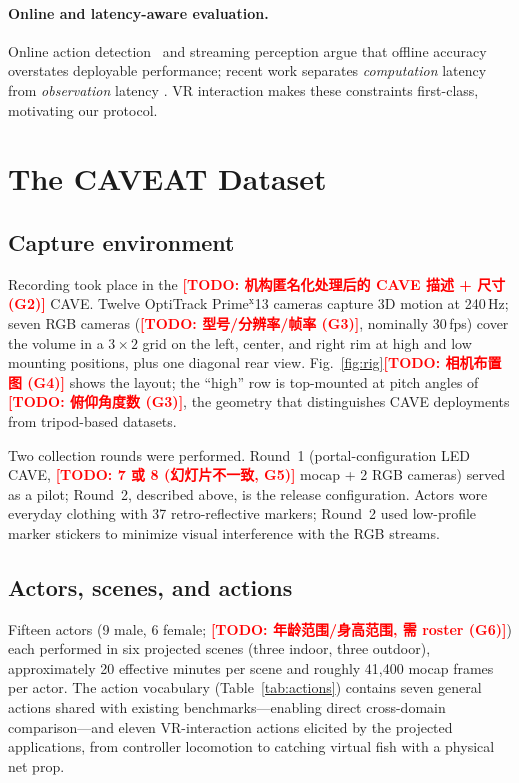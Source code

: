 \documentclass[10pt,twocolumn,letterpaper]{article}
\newcommand{\todocjkfont}{}
\newif\iftodos \todostrue   %
\newcommand{\todo}[1]{\iftodos\textcolor{red}{\textbf{[TODO: {\todocjkfont #1}]}}\fi}
\newcommand{\DATASET}{CAVEAT}
\begin{document}
\paragraph{Online and latency-aware evaluation.}
Online action detection~\cite{degeest2016oad} and streaming perception
argue that offline accuracy overstates deployable performance; recent work
separates \emph{computation} latency from \emph{observation} latency
\cite{eyzaguirre2024squid}. VR interaction makes these constraints
first-class, motivating our protocol.

\section{The \DATASET{} Dataset}

\subsection{Capture environment}
Recording took place in the \todo{机构匿名化处理后的 CAVE 描述 + 尺寸
(G2)} CAVE. Twelve OptiTrack Prime$^{\mathrm{x}}$13 cameras capture 3D
motion at 240\,Hz; seven RGB cameras (\todo{型号/分辨率/帧率 (G3)},
nominally 30\,fps) cover the volume in a $3{\times}2$ grid on the left,
center, and right rim at high and low mounting positions, plus one
diagonal rear view. Fig.~\ref{fig:rig}\todo{相机布置图 (G4)} shows the
layout; the ``high'' row is top-mounted at pitch angles of
\todo{俯仰角度数 (G3)}, the geometry that distinguishes CAVE deployments
from tripod-based datasets.

Two collection rounds were performed. Round~1 (portal-configuration LED
CAVE, \todo{7 或 8 (幻灯片不一致, G5)} mocap + 2 RGB cameras) served as a
pilot; Round~2, described above, is the release configuration. Actors wore
everyday clothing with 37 retro-reflective markers; Round~2 used low-profile
marker stickers to minimize visual interference with the RGB streams.

\subsection{Actors, scenes, and actions}
Fifteen actors (9 male, 6 female; \todo{年龄范围/身高范围, 需 roster (G6)})
each performed in six projected scenes (three indoor, three outdoor),
approximately 20 effective minutes per scene and roughly 41{,}400 mocap
frames per actor. The action vocabulary (Table~\ref{tab:actions}) contains
seven general actions shared with existing benchmarks---enabling direct
cross-domain comparison---and eleven VR-interaction actions elicited by the
projected applications, from controller locomotion to catching virtual
fish with a physical net prop.
\end{document}
